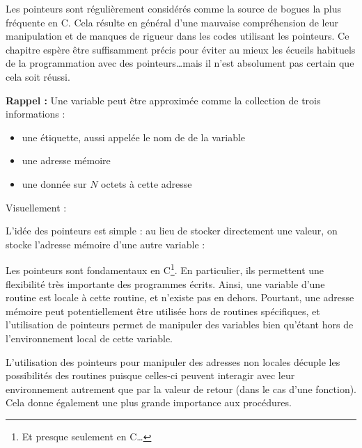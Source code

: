 \documentclass[../../../main.tex]{subfiles}
\begin{document}
Les pointeurs sont régulièrement considérés comme la source de bogues la plus fréquente en C. Cela résulte en général d'une mauvaise compréhension de leur manipulation et de manques de rigueur dans les codes utilisant les pointeurs.
Ce chapitre espère être suffisamment précis pour éviter au mieux les écueils habituels de la programmation avec des pointeurs\dots mais il n'est absolument pas certain que cela soit réussi.
 
\textbf{Rappel :} Une variable peut être approximée comme la collection de trois informations :
\begin{itemize}
	\item une étiquette, aussi appelée le nom de de la variable
	\item une adresse mémoire
	\item une donnée sur $N$ octets à cette adresse
\end{itemize}
Visuellement : 

\begin{minipage}{\textwidth}
	\begin{center}
		
	\end{center}
\end{minipage} 

L'idée des pointeurs est simple : au lieu de stocker directement une valeur, on stocke l'adresse mémoire d'une autre variable :

\begin{minipage}{\textwidth}
	\begin{center}
		
	\end{center}
\end{minipage}
 
Les pointeurs sont fondamentaux en C\footnote{Et presque seulement en C\dots}. En particulier, ils permettent une flexibilité très importante des programmes écrits. Ainsi, une variable d'une routine est locale à cette routine, et n'existe pas en dehors. Pourtant, une adresse mémoire peut potentiellement être utilisée hors de routines spécifiques, et l'utilisation de pointeurs permet de manipuler des variables bien qu'étant hors de l'environnement local de cette variable.

L'utilisation des pointeurs pour manipuler des adresses non locales décuple les possibilités des routines puisque celles-ci peuvent interagir avec leur environnement autrement que par la valeur de retour (dans le cas d'une fonction). Cela donne également une plus grande importance aux procédures.
\end{document}
